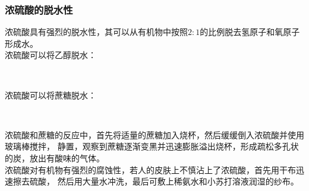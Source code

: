 \documentclass[UTF8]{ctexart}
\begin{document}
\subsubsection{浓硫酸的脱水性}
    浓硫酸具有强烈的脱水性，其可以从有机物中按照$2:1$的比例脱去氢原子和氧原子形成水。\\[3mm]
    浓硫酸可以将乙醇脱水：
    \begin{center}
        \\[4mm]
    \end{center}
    浓硫酸可以将蔗糖脱水：
    \begin{center}
        \\[4mm]
    \end{center}
    浓硫酸和蔗糖的反应中，首先将适量的蔗糖加入烧杯，然后缓缓倒入浓硫酸并使用玻璃棒搅拌，
    静置，观察到蔗糖逐渐变黑并迅速膨胀溢出烧杯，形成疏松多孔状的炭，放出有酸味的气体。\\[3mm]
    浓硫酸对有机物有强烈的腐蚀性，若人的皮肤上不慎沾上了浓硫酸，首先用干布迅速擦去硫酸，
    然后用大量水冲洗，最后可敷上稀氨水和小苏打溶液润湿的纱布。

\newpage
\end{document}
